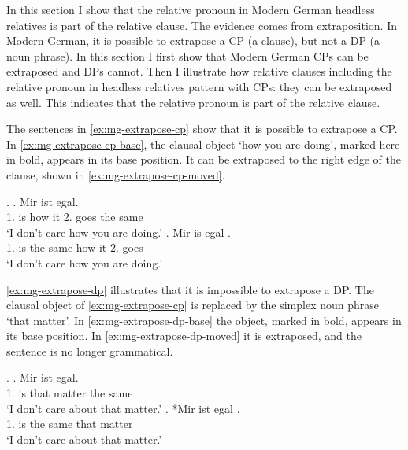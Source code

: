 In this section I show that the relative pronoun in Modern German headless relatives is part of the relative clause. The evidence comes from extraposition. In Modern German, it is possible to extrapose a CP (a clause), but not a DP (a noun phrase). In this section I first show that Modern German CPs can be extraposed and DPs cannot. Then I illustrate how relative clauses including the relative pronoun in headless relatives pattern with CPs: they can be extraposed as well. This indicates that the relative pronoun is part of the relative clause.

The sentences in \ref{ex:mg-extrapose-cp} show that it is possible to extrapose a CP. In \ref{ex:mg-extrapose-cp-base}, the clausal object  `how you are doing', marked here in bold, appears in its base position. It can be extraposed to the right edge of the clause, shown in \ref{ex:mg-extrapose-cp-moved}.

\ex.\label{ex:mg-extrapose-cp}
\ag. Mir ist     egal.\\
 1. is how it 2. goes {the same}\\
 `I don't care how you are doing.' \label{ex:mg-extrapose-cp-base}
\bg. Mir is egal    .\\
 1. is {the same} how it 2. goes\\
 `I don't care how you are doing.' \label{ex:mg-extrapose-cp-moved}

\ref{ex:mg-extrapose-dp} illustrates that it is impossible to extrapose a DP. The clausal object of \ref{ex:mg-extrapose-cp} is replaced by the simplex noun phrase  `that matter'.
In \ref{ex:mg-extrapose-dp-base} the object, marked in bold, appears in its base position. In \ref{ex:mg-extrapose-dp-moved} it is extraposed, and the sentence is no longer grammatical.

\ex.\label{ex:mg-extrapose-dp}
\ag. Mir ist   egal.\\
 1. is that matter {the same}\\
 `I don't care about that matter.' \label{ex:mg-extrapose-dp-base}
\bg. *Mir ist egal  .\\
 1. is {the same} that matter\\
 `I don't care about that matter.' \label{ex:mg-extrapose-dp-moved}

